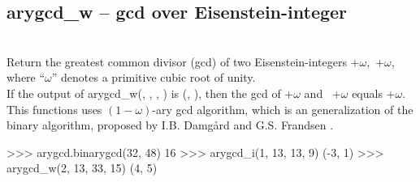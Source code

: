   \subsection{arygcd\_w -- gcd over Eisenstein-integer}
   \\
   \spacing
   \quad Return the greatest common divisor (gcd) of two Eisenstein-integers +$\omega$,\ +$\omega$, 
   where ``$\omega$'' denotes a primitive cubic root of unity.\\
   \spacing
   If the output of arygcd\_w(, , , ) is (, ), then
   the gcd of +$\omega$ and \ +$\omega$ equals +$\omega$.\\
   \negok This functions uses $(1-\omega)$-ary gcd algorithm, which is an generalization of the binary algorithm, proposed by I.B. Damg{\aa}rd and G.S. Frandsen \cite{Dam-Frand}. \\
%
\begin{ex}
>>> arygcd.binarygcd(32, 48)
16
>>> arygcd_i(1, 13, 13, 9)
(-3, 1)
>>> arygcd_w(2, 13, 33, 15)
(4, 5)
\end{ex}%
\C



